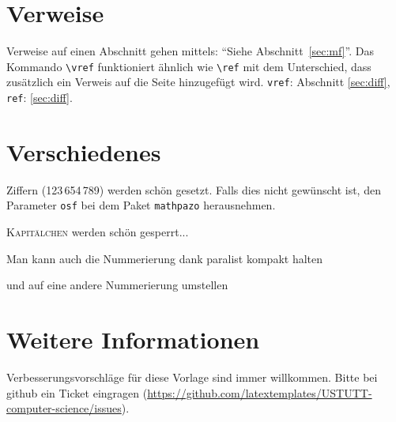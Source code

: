 \section{Verweise}
Verweise auf einen Abschnitt gehen mittels: ``Siehe Abschnitt~\autoref{sec:mf}''. Das Kommando \texttt{\textbackslash{}vref} funktioniert ähnlich wie \texttt{\textbackslash{}ref} mit dem Unterschied, dass zusätzlich ein Verweis auf die Seite hinzugefügt wird. \texttt{vref}: Abschnitt \autoref{sec:diff}, \texttt{ref}: \autoref{sec:diff}.




\section{Verschiedenes}
\label{sec:diff}
\ifdeutsch
Ziffern (123\,654\,789) werden schön gesetzt. Falls dies nicht gewünscht ist, den Parameter \texttt{osf} bei dem Paket \texttt{mathpazo} herausnehmen.
\fi

\textsc{Kapitälchen} werden schön gesperrt...

\begin{compactenum}[I]
\item Man kann auch die Nummerierung dank paralist kompakt halten
\item und auf eine andere Nummerierung umstellen
\end{compactenum}

\section{Weitere Informationen}
Verbesserungsvorschläge für diese Vorlage sind immer willkommen. Bitte bei github ein Ticket eingragen (\url{https://github.com/latextemplates/USTUTT-computer-science/issues}).
